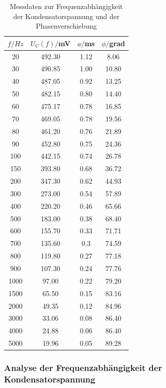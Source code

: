 \begin{table}
\centering
\caption{Messdaten zur Frequenzabhängigkeit der Kondensatorspannung und der Phasenverschiebung}
\label{tab:frequenzen}
\begin{tabular}{c c c c}
\toprule
$f/Hz$ & $U_\text{C}(f)/$mV & $a/$ms & $\phi/$grad\\
\midrule
  20	&  492.30  &  1.12  &   8.06 \\
  30	&  490.85  &  1.00  &  10.80 \\
  40	&  487.05  &  0.92  &  13.25 \\
  50	&  482.15  &  0.80  &  14.40 \\
  60	&  475.17  &  0.78  &  16.85 \\
  70	&  469.05  &  0.78  &  19.56 \\
  80	&  461.20  &  0.76  &  21.89 \\
  90	&  452.80  &  0.75  &  24.36 \\
 100	&  442.15  &  0.74  &  26.78 \\
 150	&  393.80  &  0.68  &  36.72 \\
 200	&  347.30  &  0.62  &  44.93 \\
 300	&  273.00  &  0.54  &  57.89 \\
 400	&  220.20  &  0.46  &  65.66 \\
 500	&  183.00  &  0.38  &  68.40 \\
 600	&  155.70  &  0.33  &  71.71 \\
 700	&  135.60  &  0.3   &  74.59 \\
 800	&  119.80  &  0.27  &  77.18 \\
 900	&  107.30  &  0.24  &  77.76 \\
1000	&   97.00  &  0.22  &  79.20 \\
1500	&   65.50  &  0.15  &  83.16 \\
2000	&   49.35  &  0.12  &  84.96 \\
3000	&   33.06  &  0.08  &  86.40 \\
4000	&   24.88  &  0.06  &  86.40 \\
5000	&   19.96  &  0.05  &  89.28 \\
\bottomrule
\end{tabular}
\end{table}

\subsubsection{Analyse der Frequenzabhängigkeit der Kondensatorspannung}

